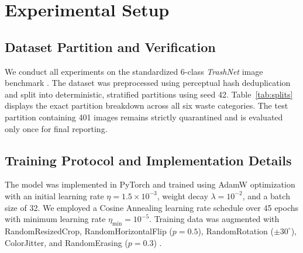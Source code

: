 \documentclass[11pt,a4paper]{article}
\newcommand{\trashsamples}{401}
\begin{document}
\section{Experimental Setup}

\subsection{Dataset Partition and Verification}
We conduct all experiments on the standardized 6-class \textit{TrashNet} image benchmark \cite{thung2016}. The dataset was preprocessed using perceptual hash deduplication and split into deterministic, stratified partitions using seed 42. Table~\ref{tab:splits} displays the exact partition breakdown across all six waste categories. The test partition containing \trashsamples{} images remains strictly quarantined and is evaluated only once for final reporting.

\begin{table}[H]
\centering
\caption{Verified partition counts for the six-class TrashNet benchmark.}
\label{tab:splits}
\end{table}

\subsection{Training Protocol and Implementation Details}
The model was implemented in PyTorch and trained using AdamW optimization \cite{loshchilov2017} with an initial learning rate $\eta = 1.5 \times 10^{-3}$, weight decay $\lambda = 10^{-2}$, and a batch size of 32. We employed a Cosine Annealing learning rate schedule \cite{loshchilov2016} over 45 epochs with minimum learning rate $\eta_{\min} = 10^{-5}$. Training data was augmented with RandomResizedCrop, RandomHorizontalFlip ($p=0.5$), RandomRotation ($\pm 30^\circ$), ColorJitter, and RandomErasing ($p=0.3$) \cite{zhong2020}.
\end{document}

